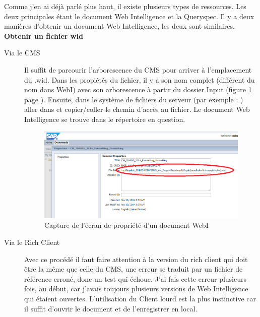 Comme j'en ai d\'{e}j\`{a} parl\'{e} plus haut, il existe plusieurs types de ressources. Les deux principales \'{e}tant le document Web Intelligence et la \gls{Queryspec}.
Il y a deux mani\`{e}res d'obtenir un document Web Intelligence, les deux sont similaires.\\
\textbf{Obtenir un fichier wid}
\begin{description}
	\item	[Via le CMS] 
	\begin{sloppypar}
	Il suffit de parcourir l'arborescence du CMS pour arriver \`{a} l'emplacement du .wid. Dans les propi\'{e}t\'{e}s du fichier, il y a son nom complet (diff\'{e}rent du nom dans WebI) avec son arborescence \`{a} partir du dossier Input (figure \ref{figure:widFileLocation} page \pageref{figure:widFileLocation} ). Ensuite, dans le syst\`{e}me de fichiers du serveur (par exemple : ) aller dans 
	 et copier/coller le chemin d'acc\`{e}s au fichier. Le document Web Intelligence se trouve dans le r\'{e}pertoire en question.
	\end{sloppypar}
\begin{figure}[!ht]
  \centering
      \includegraphics[width=\textwidth]{images/widFileLocation.png}
  \caption{Capture de l'\'{e}cran de propri\'{e}t\'{e} d'un document WebI}
	\label{figure:widFileLocation}
\end{figure}
	\item[Via le Rich Client]
	Avec ce proc\'{e}d\'{e} il faut faire attention \`{a} la version du rich client qui doit \^{e}tre la m\^{e}me que celle du CMS, une erreur se traduit par un fichier de r\'{e}f\'{e}rence erron\'{e}, donc un test qui \'{e}choue. J'ai fais cette erreur plusieurs fois, au d\'{e}but, car j'avais toujours plusieurs versions de Web Intelligence qui \'{e}taient ouvertes. L'utilisation du \gls{Client lourd} est la plus instinctive car il suffit d'ouvrir le document et de l'enregistrer en local.
\end{description}
